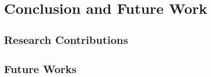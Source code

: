 \chapter{Conclusion and Future Work}\label{conclusionfuture}
\section{Research Contributions}\label{contribution}
\section{Future Works}\label{future}
